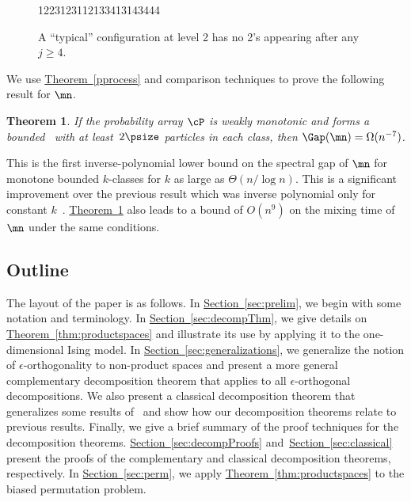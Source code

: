 \documentclass[11pt]{article}
\newtheorem{theorem}{Theorem}[section]
\providecommand{\expref}[2]{\texorpdfstring{\hyperref[#2]{#1~\ref{#2}}}{#1~\ref{#2}}}
\begin{document}
\begin{figure}[]
  \centering
           \newcommand{\one}{{\color{gray}1}}
         {\color{red} \one 223\one 23\one \one 2\one 334\one 3\one 43444}\\
      \caption{A ``typical'' configuration at level 2 has no 2's appearing after any $j\geq 4$.}
\label{fig:typical}
\end{figure}

We use \expref{Theorem}{pprocess} and comparison techniques to prove the following result for $\mn$.

\newtheorem*{mnGap}{\expref{Theorem}{thm:mnGap}}

\begin{theorem}\label{thm:mnGap} If the
%
probability array $\cP$ is  %
weakly monotonic and
%
forms  %
a bounded \kP\, with at least~$2\psize$ particles 
 in each class, then $\Gap(\mn)=\Omega(n^{-7})$.
\end{theorem}

 
\noindent This is the first inverse-polynomial %
lower   %
bound on the spectral 
gap of $\mn$ for monotone bounded $k$-classes for $k$ as large as 
$\Theta(n/\log n)$.  This is a significant improvement over the 
previous result which was inverse polynomial only for constant 
$k$~\cite{MR00}.  \expref{Theorem}{thm:mnGap} also leads to a bound of 
$O(n^9)$ on the mixing time of $\mn$ under the same conditions.

\subsection{Outline}

The layout of the paper is as follows.  In \expref{Section}{sec:prelim}, we 
begin with some notation and terminology.  In 
\expref{Section}{sec:decompThm}, we give details on 
\expref{Theorem}{thm:productspaces} and illustrate its use by applying it 
to the one-dimensional Ising model. In 
\expref{Section}{sec:generalizations}, we generalize the notion of 
$\epsilon$-orthogonality to non-product spaces and present a more 
general complementary decomposition theorem that applies to all 
$\epsilon$-orthogonal decompositions. We also present a classical 
decomposition theorem that generalizes some results of~\cite{jstv04} 
and show how our decomposition theorems relate to previous results. 
Finally, we give a brief summary of the proof techniques for the 
decomposition theorems.  \expref{Section}{sec:decompProofs} 
and~\expref{Section}{sec:classical} present the proofs of the complementary and 
classical decomposition theorems, respectively. In 
\expref{Section}{sec:perm}, we apply \expref{Theorem}{thm:productspaces} to the 
biased permutation problem. 
\end{document}
